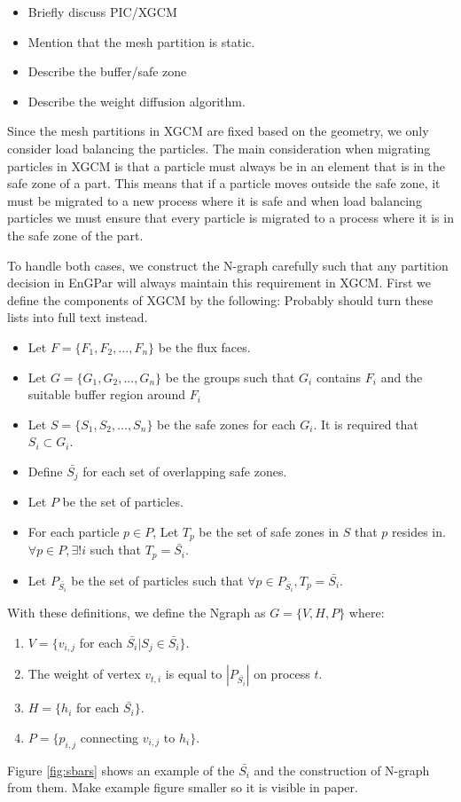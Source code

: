\documentclass[conference]{IEEEtran}
\begin{document}
\begin{itemize}
\item Briefly discuss PIC/XGCM
\item Mention that the mesh partition is static.
\item Describe the buffer/safe zone
\item Describe the weight diffusion algorithm.
\end{itemize}

Since the mesh partitions in XGCM are fixed based on the geometry, we only consider
load balancing the particles. The main consideration when migrating particles in XGCM
is that a particle must always be in an element that is in the safe zone of a part.
This means that if a particle moves outside the safe zone, it must be migrated to a
new process where it is safe and when load balancing particles we must ensure that every
particle is migrated to a process where it is in the safe zone of the part.

To handle both cases, we construct the N-graph carefully such that any partition
decision in EnGPar will always maintain this requirement in XGCM. First we define
the components of XGCM by the following: {\color{red} Probably should turn these lists
  into full text instead.}
\begin{itemize}
\item Let $F = \{F_1,F_2, ..., F_n\}$ be the flux faces.
\item Let $G = \{G_1, G_2, ..., G_n\}$ be the groups such that $G_i$
  contains $F_i$ and the suitable buffer region around $F_i$
\item Let $S = \{S_1,S_2,...,S_n\}$ be the safe zones for each $G_i$.
  It is required that $S_i \subset G_i$.
\item Define $\bar{S_j}$ for each set of overlapping safe zones.
\item Let $P$ be the set of particles.
\item For each particle $p\in P$, Let $T_p$ be the set of safe zones in $S$ that $p$ resides
  in.  $\forall p \in P, \exists ! i$ such that $T_p = \bar{S_i}$.
\item  Let $P_{\bar{S_i}}$ be the set of particles such that $\forall p \in P_{\bar{S_i}}, T_p = \bar{S_i}$.
\end{itemize}

With these definitions, we define the Ngraph as $G = \{V, H, P\}$ where:
\begin{enumerate}
\item $V = \{ v_{i,j}$ for each $\bar{S_i} | S_j \in \bar{S_i} \}$.
\item The weight of vertex $v_{t,i}$ is equal to $|P_{\bar{S_i}}|$ on process $t$.
\item $H = \{ h_i$ for each $\bar{S_i} \}$.
\item $P = \{ p_{i,j}$ connecting $v_{i,j}$ to $h_i \}$.
\end{enumerate}
Figure \ref{fig:sbars} shows an example of the $\bar{S_i}$ and the construction of N-graph from
them. {\color{red} Make example figure smaller so it is visible in paper.}
\end{document}
